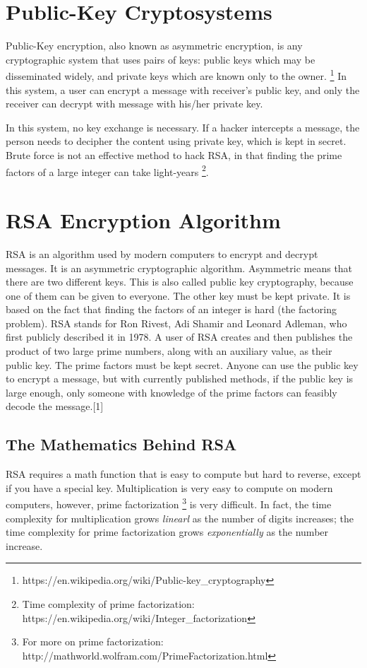 \documentclass[]{article}
\begin{document}
\section{Public-Key Cryptosystems}

Public-Key encryption, also known as asymmetric encryption, is any cryptographic system that uses pairs of keys: public keys which may be disseminated widely, and private keys which are known only to the owner. \footnote{https://en.wikipedia.org/wiki/Public-key\_cryptography} In this system, a user can encrypt a message with receiver's public key, and only the receiver can decrypt with message with his/her private key. 

In this system, no key exchange is necessary. If a hacker intercepts a message, the person needs to decipher the content using private key, which is kept in secret. Brute force is not an effective method to hack RSA, in that finding the prime factors of a large integer can take light-years \footnote{Time complexity of prime factorization: https://en.wikipedia.org/wiki/Integer\_factorization}.  

\section{RSA Encryption Algorithm}
RSA is an algorithm used by modern computers to encrypt and decrypt messages. It is an asymmetric cryptographic algorithm. Asymmetric means that there are two different keys. This is also called public key cryptography, because one of them can be given to everyone. The other key must be kept private. It is based on the fact that finding the factors of an integer is hard (the factoring problem). RSA stands for Ron Rivest, Adi Shamir and Leonard Adleman, who first publicly described it in 1978. A user of RSA creates and then publishes the product of two large prime numbers, along with an auxiliary value, as their public key. The prime factors must be kept secret. Anyone can use the public key to encrypt a message, but with currently published methods, if the public key is large enough, only someone with knowledge of the prime factors can feasibly decode the message.[1]


\subsection{The Mathematics Behind RSA}

RSA requires a math function that is easy to compute but hard to reverse, except if you have a special key. Multiplication is very easy to compute on modern computers, however, prime factorization \footnote{For more on prime factorization: http://mathworld.wolfram.com/PrimeFactorization.html} is very difficult. In fact, the time complexity for multiplication grows \textit{linearl}  as the number of digits increases; the time complexity for prime factorization grows \textit{exponentially} as the number increase. 
\end{document}
